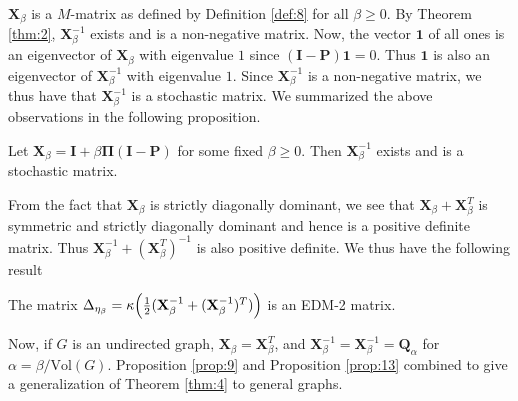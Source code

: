$\mathbf{X}_{\beta}$ is a $M$-matrix as defined by Definition
\ref{def:8} for all $\beta \geq 0$. By
Theorem \ref{thm:2}, $\mathbf{X}_{\beta}^{-1}$ exists and is a non-negative
matrix. Now, the vector $\bm{1}$ of all ones is an eigenvector of
$\mathbf{X}_{\beta}$ with eigenvalue $1$ since $(\mathbf{I} -
\mathbf{P})\bm{1} = 0$. Thus $\bm{1}$ is also an eigenvector of
$\mathbf{X}_{\beta}^{-1}$ with eigenvalue $1$. Since
$\mathbf{X}_{\beta}^{-1}$ is a
non-negative matrix, we thus have that $\mathbf{X}_{\beta}^{-1}$ is a
stochastic matrix. We summarized the above observations in the
following proposition.  
\begin{proposition}
  \label{prop:9}
  Let $\mathbf{X}_{\beta} = \mathbf{I} + \beta \bm{\Pi}(\mathbf{I} -
  \mathbf{P})$ for some fixed $\beta \geq 0$. Then
  $\mathbf{X}_{\beta}^{-1}$ exists and is a stochastic
  matrix. 
\end{proposition}
From the fact that $\mathbf{X}_{\beta}$ is strictly diagonally dominant, we
see that $\mathbf{X}_{\beta} + \mathbf{X}_{\beta}^{T}$ is symmetric and strictly
diagonally dominant and hence is a positive definite matrix. Thus
$\mathbf{X}_{\beta}^{-1} + (\mathbf{X}_{\beta}^{T})^{-1}$ is also positive definite. 
We thus have the following result 
\begin{proposition}
  \label{prop:13}
  The matrix $\Delta_{\eta_{\beta}} =
  \kappa\Bigl(\tfrac{1}{2}(\mathbf{X}_{\beta}^{-1} +
  (\mathbf{X}_{\beta}^{-1})^{T})\Bigr)$ is an EDM-2 matrix. 
\end{proposition}
Now, if $G$ is an undirected graph, $\mathbf{X}_{\beta} =
\mathbf{X}_{\beta}^{T}$, and $\mathbf{X}_{\beta}^{-1} =
\mathbf{X}_{\beta}^{-1} = \mathbf{Q}_{\alpha}$ for $\alpha =
\beta/\mathrm{Vol}(G)$. Proposition \ref{prop:9} and Proposition
\ref{prop:13} combined to give a generalization of Theorem \ref{thm:4}
to general graphs. 
